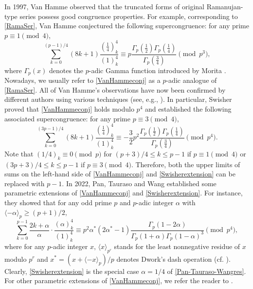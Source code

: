 \documentclass[12pt,reqno]{amsart}
\def\f{\frac}
\def\eq{\equiv}
\def\<{\langle}
\def\>{\rangle}
\theoremstyle{plain}
\theoremstyle{definition}
\theoremstyle{remark}
\numberwithin{equation}{section}
\begin{document}
In 1997, Van Hamme \cite{VanHamme1997} observed that the truncated forms of original Ramanujan-type series possess good congruence properties. For example, corresponding to \eqref{RamaSer}, Van Hamme conjectured the following supercongruence: for any prime $p\eq1\pmod4$,
\begin{equation}\label{VanHammeconj}
\sum_{k=0}^{(p-1)/4}(8k+1)\f{(\f14)_k^4}{(1)_k^4}\eq p\f{\Gamma_p(\f12)\Gamma_p(\f14)}{\Gamma_p(\f34)}\pmod{p^3},
\end{equation}
where $\Gamma_p(x)$ denotes the $p$-adic Gamma function introduced by Morita \cite{Morita1975}. Nowadays, we usually refer to \eqref{VanHammeconj} as a $p$-adic analogue of \eqref{RamaSer}. All of Van Hamme's observations have now been confirmed by different authors using various techniques (see, e.g., \cite{Long2011,McCarthy-Osburn2008,Mortenson2008,Osburn-Zudilin2016,Swisher2015}). In particular, Swisher \cite{Swisher2015} proved that \eqref{VanHammeconj} holds modulo $p^4$ and established the following associated supercongruence: for any prime $p\eq3\pmod4$,
\begin{equation}\label{Swisherextension}
\sum_{k=0}^{(3p-1)/4}(8k+1)\f{(\f14)_k^4}{(1)_k^4}\eq -\f{3}{2}p^2\f{\Gamma_p(\f12)\Gamma_p(\f14)}{\Gamma_p(\f34)}\pmod{p^4}.
\end{equation}
Note that $(1/4)_k\eq0\pmod{p}$ for $(p+3)/4\leq k\leq p-1$ if $p\eq1\pmod4$ or $(3p+3)/4\leq k\leq p-1$ if $p\eq3\pmod4$. Therefore, both the upper limits of sums on the left-hand side of \eqref{VanHammeconj} and \eqref{Swisherextension} can be replaced with $p-1$. In 2022, Pan, Tauraso and Wang \cite{Pan-Tauraso-Wang2022} established some parametric extensions of \eqref{VanHammeconj} and \eqref{Swisherextension}. For instance, they showed that for any odd prime $p$ and $p$-adic integer $\alpha$ with $\<-\alpha\>_p\geq (p+1)/2$,
\begin{equation}\label{Pan-Tauraso-Wangres}
\sum_{k=0}^{p-1}\f{2k+\alpha}{\alpha}\cdot\f{(\alpha)_k^4}{(1)_k^4}\eq p^2\alpha^{\ast}(2\alpha^{\ast}-1)\f{\Gamma_p(1-2\alpha)}{\Gamma_p(1+\alpha)\Gamma_p(1-\alpha)^3}\pmod{p^4},
\end{equation}
where for any $p$-adic integer $x$, $\<x\>_{p^r}$ stands for the least nonnegative residue of $x$ modulo $p^r$ and $x^{\ast}=(x+\<-x\>_p)/p$ denotes Dwork's dash operation (cf. \cite{Dwork1969}). Clearly, \eqref{Swisherextension} is the special case $\alpha=1/4$ of  \eqref{Pan-Tauraso-Wangres}.
For other parametric extensions of \eqref{VanHammeconj}, we refer the reader to \cite{Barman-Saikia2020, Guo2025, Guo-Schlosser2020, Liu-Wang2021, Liu-Wang2022, Pan-Tauraso-Wang2022}.
\end{document}
